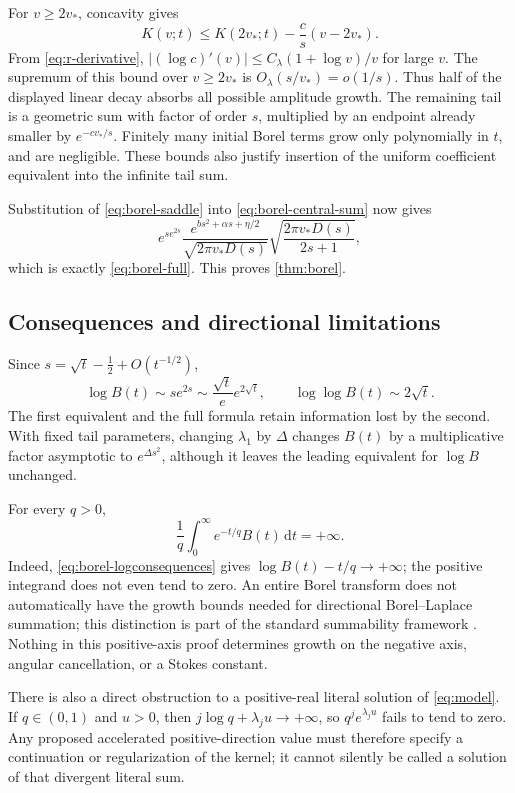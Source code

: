 \documentclass[11pt,a4paper]{article}
\theoremstyle{definition}
\newcommand{\dd}{\,\mathrm d}
\numberwithin{equation}{section}
\begin{document}
For \(v\ge2v_*\), concavity gives
\[
 K(v;t)\le K(2v_*;t)-\frac{c}{s}(v-2v_*).
\]
From \eqref{eq:r-derivative},
\(|(\log c)'(v)|\le C_\lambda(1+\log v)/v\) for large \(v\).
The supremum of this bound over \(v\ge2v_*\) is
\(O_\lambda(s/v_*)=o(1/s)\). Thus half of the displayed linear
decay absorbs all possible amplitude growth. The remaining tail is a
geometric sum with factor of order \(s\), multiplied by an endpoint
already smaller by \(e^{-c v_*/s}\).
Finitely many initial Borel terms grow only polynomially in \(t\), and
are negligible. These bounds also justify insertion of the uniform
coefficient equivalent into the infinite tail sum.

Substitution of \eqref{eq:borel-saddle} into
\eqref{eq:borel-central-sum} now gives
\[
 e^{s e^{2s}}
 \frac{e^{bs^2+\alpha s+\eta/2}}{\sqrt{2\pi v_*D(s)}}
 \sqrt{\frac{2\pi v_*D(s)}{2s+1}},
\]
which is exactly \eqref{eq:borel-full}. This proves \cref{thm:borel}.

\subsection{Consequences and directional limitations}
Since \(s=\sqrt t-\tfrac12+O(t^{-1/2})\),
\begin{equation}
 \log B(t)\sim s e^{2s}
             \sim\frac{\sqrt t}{e}e^{2\sqrt t},\qquad
 \log\log B(t)\sim2\sqrt t.
 \label{eq:borel-logconsequences}
\end{equation}
The first equivalent and the full formula retain information lost by the
second. With fixed tail parameters, changing \(\lambda_1\) by
\(\Delta\) changes \(B(t)\) by a multiplicative factor asymptotic to
\(e^{\Delta s^2}\), although it leaves the leading equivalent for
\(\log B\) unchanged.

For every \(q>0\),
\begin{equation}
 \frac1q\int_0^\infty e^{-t/q}B(t)\dd t=+\infty.
 \label{eq:laplace-failure}
\end{equation}
Indeed, \eqref{eq:borel-logconsequences} gives
\(\log B(t)-t/q\to+\infty\); the positive integrand does not even
tend to zero. An entire Borel transform does not automatically have the
growth bounds needed for directional Borel--Laplace summation; this
distinction is part of the standard summability framework \cite{sauzin}.
Nothing in this positive-axis proof determines growth on the negative axis,
angular cancellation, or a Stokes constant.

There is also a direct obstruction to a positive-real literal solution of
\eqref{eq:model}. If \(q\in(0,1)\) and \(u>0\), then
\(j\log q+\lambda_j u\to+\infty\), so
\(q^je^{\lambda_j u}\) fails to tend to zero. Any proposed accelerated
positive-direction value must therefore specify a continuation or
regularization of the kernel; it cannot silently be called a solution of
that divergent literal sum.
\end{document}
